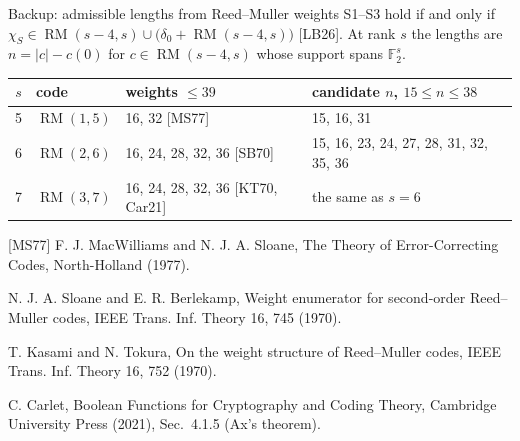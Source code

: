 \documentclass[aspectratio=169,11pt]{beamer}
\newcommand{\RM}{\operatorname{RM}}
\newcommand{\source}[1]{\par\vfill{\tiny\color{black!60}\setlength{\parskip}{1pt}#1\par}}
\newcommand{\talktext}{\small\setlength{\parskip}{2.5pt}\setlength{\abovedisplayskip}{5pt}\setlength{\belowdisplayskip}{5pt}\setlength{\abovedisplayshortskip}{3pt}\setlength{\belowdisplayshortskip}{3pt}}
\newcommand{\F}{\mathbb F}
\begin{document}
\appendix
{}

\begin{frame}[label=b-lengths]{Backup: admissible lengths from Reed--Muller weights}
\talktext
S1--S3 hold if and only if $\chi_S\in\RM(s-4,s)\cup\bigl(\delta_0+\RM(s-4,s)\bigr)$ [LB26]. At rank $s$ the lengths are $n=|c|-c(0)$ for $c\in\RM(s-4,s)$ whose support spans $\F_2^s$.
\begin{center}\scriptsize
\begin{tabular}{@{}clll@{}}\toprule
$s$ & code & weights $\le39$ & candidate $n$, $15\le n\le38$\\\midrule
5 & $\RM(1,5)$ & 16, 32 [MS77] & 15, 16, 31\\
6 & $\RM(2,6)$ & 16, 24, 28, 32, 36 [SB70] & 15, 16, 23, 24, 27, 28, 31, 32, 35, 36\\
7 & $\RM(3,7)$ & 16, 24, 28, 32, 36 [KT70, Car21] & the same as $s=6$\\\bottomrule
\end{tabular}\end{center}
\source{[MS77] F. J. MacWilliams and N. J. A. Sloane, The Theory of Error-Correcting Codes, North-Holland (1977).\par [SB70] N. J. A. Sloane and E. R. Berlekamp, Weight enumerator for second-order Reed--Muller codes, IEEE Trans. Inf. Theory 16, 745 (1970).\par [KT70] T. Kasami and N. Tokura, On the weight structure of Reed--Muller codes, IEEE Trans. Inf. Theory 16, 752 (1970).\par [Car21] C. Carlet, Boolean Functions for Cryptography and Coding Theory, Cambridge University Press (2021), Sec.~4.1.5 (Ax's theorem).}
\end{frame}
\end{document}
